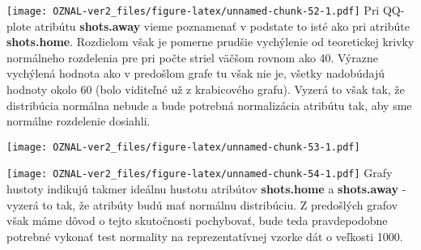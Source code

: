 \documentclass[
]{article}
\newenvironment{Shaded}{\begin{snugshade}}{\end{snugshade}}
\newcommand{\AttributeTok}[1]{\textcolor[rgb]{0.77,0.63,0.00}{#1}}
\newcommand{\ConstantTok}[1]{\textcolor[rgb]{0.00,0.00,0.00}{#1}}
\newcommand{\DecValTok}[1]{\textcolor[rgb]{0.00,0.00,0.81}{#1}}
\newcommand{\FloatTok}[1]{\textcolor[rgb]{0.00,0.00,0.81}{#1}}
\newcommand{\FunctionTok}[1]{\textcolor[rgb]{0.00,0.00,0.00}{#1}}
\newcommand{\NormalTok}[1]{#1}
\newcommand{\SpecialCharTok}[1]{\textcolor[rgb]{0.00,0.00,0.00}{#1}}
\newcommand{\StringTok}[1]{\textcolor[rgb]{0.31,0.60,0.02}{#1}}
\begin{document}
\texttt{[image: OZNAL-ver2\_files/figure-latex/unnamed-chunk-52-1.pdf]}
Pri QQ-plote atribútu \textbf{shots.away} vieme poznamenať v podstate to
isté ako pri atribúte \textbf{shots.home}. Rozdielom však je pomerne
prudšie vychýlenie od teoretickej krivky normálneho rozdelenia pre pri
počte striel väčšom rovnom ako 40. Výrazne vychýlená hodnota ako v
predošlom grafe tu však nie je, všetky nadobúdajú hodnoty okolo 60 (bolo
viditeľné už z krabicového grafu). Vyzerá to však tak, že distribúcia
normálna nebude a bude potrebná normalizácia atribútu tak, aby sme
normálne rozdelenie dosiahli.

\begin{Shaded}
\end{Shaded}

\texttt{[image: OZNAL-ver2\_files/figure-latex/unnamed-chunk-53-1.pdf]}

\begin{Shaded}
\end{Shaded}

\texttt{[image: OZNAL-ver2\_files/figure-latex/unnamed-chunk-54-1.pdf]}
Grafy hustoty indikujú takmer ideálnu hustotu atribútov
\textbf{shots.home} a \textbf{shots.away} - vyzerá to tak, že atribúty
budú mať normálnu distribúciu. Z predošlých grafov však máme dôvod o
tejto skutočnosti pochybovať, bude teda pravdepodobne potrebné vykonať
test normality na reprezentatívnej vzorke dát o veľkosti 1000.

\begin{Shaded}
\end{Shaded}
\end{document}
